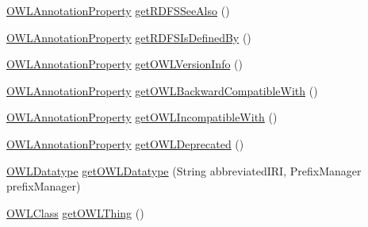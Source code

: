 \begin{DoxyCompactItemize}
\item 
\hyperlink{interfaceorg_1_1semanticweb_1_1owlapi_1_1model_1_1_o_w_l_annotation_property}{O\-W\-L\-Annotation\-Property} \hyperlink{classuk_1_1ac_1_1manchester_1_1cs_1_1owl_1_1owlapi_1_1_o_w_l_data_factory_impl_a30498eb200707fad29e58829bae62971}{get\-R\-D\-F\-S\-See\-Also} ()
\item 
\hyperlink{interfaceorg_1_1semanticweb_1_1owlapi_1_1model_1_1_o_w_l_annotation_property}{O\-W\-L\-Annotation\-Property} \hyperlink{classuk_1_1ac_1_1manchester_1_1cs_1_1owl_1_1owlapi_1_1_o_w_l_data_factory_impl_a04ede92746a6a0fd9831036a2a0160ba}{get\-R\-D\-F\-S\-Is\-Defined\-By} ()
\item 
\hyperlink{interfaceorg_1_1semanticweb_1_1owlapi_1_1model_1_1_o_w_l_annotation_property}{O\-W\-L\-Annotation\-Property} \hyperlink{classuk_1_1ac_1_1manchester_1_1cs_1_1owl_1_1owlapi_1_1_o_w_l_data_factory_impl_a9d7ba7d8c321fd254078916287de1099}{get\-O\-W\-L\-Version\-Info} ()
\item 
\hyperlink{interfaceorg_1_1semanticweb_1_1owlapi_1_1model_1_1_o_w_l_annotation_property}{O\-W\-L\-Annotation\-Property} \hyperlink{classuk_1_1ac_1_1manchester_1_1cs_1_1owl_1_1owlapi_1_1_o_w_l_data_factory_impl_a0a0c2152986ad0ef204322cb5f891104}{get\-O\-W\-L\-Backward\-Compatible\-With} ()
\item 
\hyperlink{interfaceorg_1_1semanticweb_1_1owlapi_1_1model_1_1_o_w_l_annotation_property}{O\-W\-L\-Annotation\-Property} \hyperlink{classuk_1_1ac_1_1manchester_1_1cs_1_1owl_1_1owlapi_1_1_o_w_l_data_factory_impl_ad1527843784be46afaa709ee9990f499}{get\-O\-W\-L\-Incompatible\-With} ()
\item 
\hyperlink{interfaceorg_1_1semanticweb_1_1owlapi_1_1model_1_1_o_w_l_annotation_property}{O\-W\-L\-Annotation\-Property} \hyperlink{classuk_1_1ac_1_1manchester_1_1cs_1_1owl_1_1owlapi_1_1_o_w_l_data_factory_impl_a1477d7c069c009313773e11e30d38ff8}{get\-O\-W\-L\-Deprecated} ()
\item 
\hyperlink{interfaceorg_1_1semanticweb_1_1owlapi_1_1model_1_1_o_w_l_datatype}{O\-W\-L\-Datatype} \hyperlink{classuk_1_1ac_1_1manchester_1_1cs_1_1owl_1_1owlapi_1_1_o_w_l_data_factory_impl_a2ed94192cfd351678ec76b517f7feed2}{get\-O\-W\-L\-Datatype} (String abbreviated\-I\-R\-I, Prefix\-Manager prefix\-Manager)
\item 
\hyperlink{interfaceorg_1_1semanticweb_1_1owlapi_1_1model_1_1_o_w_l_class}{O\-W\-L\-Class} \hyperlink{classuk_1_1ac_1_1manchester_1_1cs_1_1owl_1_1owlapi_1_1_o_w_l_data_factory_impl_ae27242bb9278da776567a7fbbfe076f3}{get\-O\-W\-L\-Thing} ()

\end{DoxyCompactItemize}
